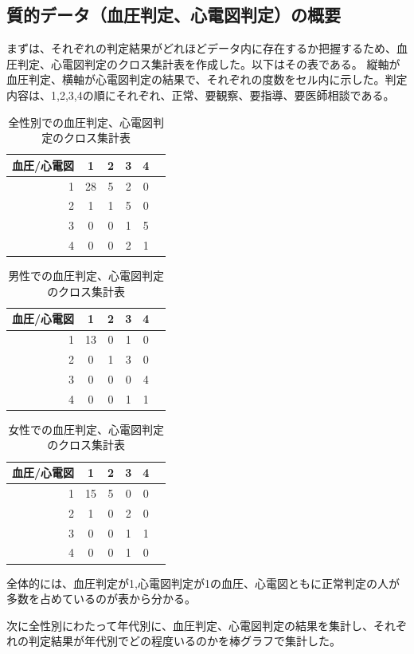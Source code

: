 \documentclass[dvipdfmx]{jsarticle}
\begin{document}
    \subsection{質的データ（血圧判定、心電図判定）の概要}
    まずは、それぞれの判定結果がどれほどデータ内に存在するか把握するため、血圧判定、心電図判定のクロス集計表を作成した。以下はその表である。
    縦軸が血圧判定、横軸が心電図判定の結果で、それぞれの度数をセル内に示した。判定内容は、1,2,3,4の順にそれぞれ、正常、要観察、要指導、要医師相談である。
    \begin{table}[H]
        \caption{全性別での血圧判定、心電図判定のクロス集計表}
        \centering
        \begin{tabular}{r|ccccl}
        血圧/心電図 & 1  & 2 & 3 & 4 &  \\ \hline
        1          & 28 & 5 & 2 & 0 &  \\
        2          & 1  & 1 & 5 & 0 &  \\
        3          & 0  & 0 & 1 & 5 &  \\
        4          & 0  & 0 & 2 & 1 & 
        \end{tabular}
    \end{table}

    \begin{table}[H]
        \caption{男性での血圧判定、心電図判定のクロス集計表}
        \centering
        \begin{tabular}{r|ccccl}
        血圧/心電図& 1  & 2 & 3 & 4 &  \\ \hline
        1          & 13 & 0 & 1 & 0 &  \\
        2          & 0  & 1 & 3 & 0 &  \\
        3          & 0  & 0 & 0 & 4 &  \\
        4          & 0  & 0 & 1 & 1 & 
        \end{tabular}
    \end{table}
    \begin{table}[H]
        \caption{女性での血圧判定、心電図判定のクロス集計表}
        \centering
        \begin{tabular}{r|ccccl}
        血圧/心電図 & 1  & 2 & 3 & 4 &  \\ \hline
        1          & 15 & 5 & 0 & 0 &  \\
        2          & 1  & 0 & 2 & 0 &  \\
        3          & 0  & 0 & 1 & 1 &  \\
        4          & 0  & 0 & 1 & 0 & 
        \end{tabular}
    \end{table}
    全体的には、血圧判定が1,心電図判定が1の血圧、心電図ともに正常判定の人が多数を占めているのが表から分かる。\par 
    次に全性別にわたって年代別に、血圧判定、心電図判定の結果を集計し、それぞれの判定結果が年代別でどの程度いるのかを棒グラフで集計した。
\end{document}
